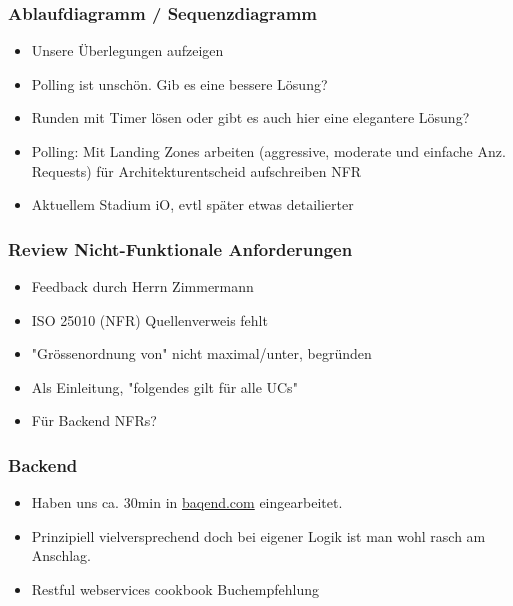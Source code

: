 \hypertarget{ablaufdiagramm-ux2f-sequenzdiagramm}{%
\subsubsection*{Ablaufdiagramm /
Sequenzdiagramm}\label{ablaufdiagramm-ux2f-sequenzdiagramm}}

\begin{itemize}
\item
  Unsere Überlegungen aufzeigen
\item
  Polling ist unschön. Gib es eine bessere Lösung?
\item
  Runden mit Timer lösen oder gibt es auch hier eine elegantere Lösung?
\item
  Polling: Mit Landing Zones arbeiten (aggressive, moderate und einfache
  Anz. Requests) für Architekturentscheid aufschreiben NFR
\item
  Aktuellem Stadium iO, evtl später etwas detailierter
\end{itemize}

\hypertarget{review-nicht-funktionale-anforderungen}{%
\subsubsection*{Review Nicht-Funktionale
Anforderungen}\label{review-nicht-funktionale-anforderungen}}

\begin{itemize}
\item
  Feedback durch Herrn Zimmermann
\item
  ISO 25010 (NFR) Quellenverweis fehlt
\item
  "Grössenordnung von" nicht maximal/unter, begründen
\item
  Als Einleitung, "folgendes gilt für alle UCs"
\item
  Für Backend NFRs?
\end{itemize}

\hypertarget{backend}{%
\subsubsection*{Backend}\label{backend}}

\begin{itemize}
\item
  Haben uns ca. 30min in \href{baqend.com}{baqend.com} eingearbeitet.
\item
  Prinzipiell vielversprechend doch bei eigener Logik ist man wohl rasch
  am Anschlag.
\item
  Restful webservices cookbook Buchempfehlung
\end{itemize}

